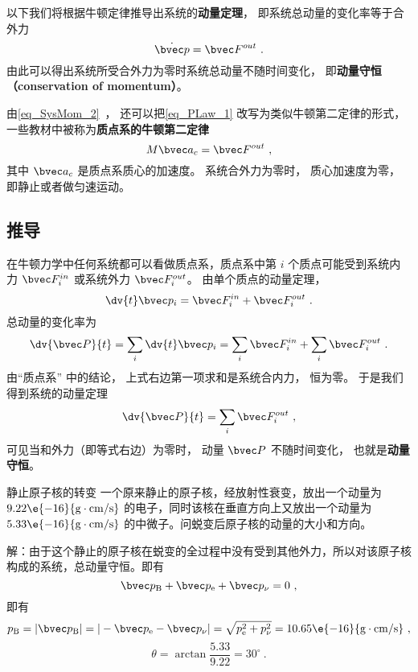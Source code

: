 
以下我们将根据牛顿定律推导出系统的\textbf{动量定理}， 即系统总动量的变化率等于合外力
\begin{equation}\label{eq_PLaw_1}
\dot {\bvec p} = \bvec F^{out}~.
\end{equation}
由此可以得出系统所受合外力为零时系统总动量不随时间变化， 即\textbf{动量守恒（conservation of momentum）}。

由\autoref{eq_SysMom_2}~， 还可以把\autoref{eq_PLaw_1} 改写为类似牛顿第二定律的形式， 一些教材中被称为\textbf{质点系的牛顿第二定律}
\begin{equation}\label{eq_PLaw_2}
M \bvec a_c = \bvec F^{out}~,
\end{equation}
其中 $\bvec a_c$ 是质点系质心的加速度。 系统合外力为零时， 质心加速度为零， 即静止或者做匀速运动。

\subsection{推导}
在牛顿力学中任何系统都可以看做质点系，质点系中第 $i$ 个质点可能受到系统内力 $\bvec F_i^{in}$ 或系统外力 $\bvec F_i^{out}$。 由单个质点的动量定理，
\begin{equation}
\dv{t} \bvec p_i = \bvec F_i^{in} + \bvec F_i^{out}~.
\end{equation}
总动量的变化率为
\begin{equation}
\dv{\bvec P}{t} = \sum_i \dv{t} \bvec p_i  = \sum_i \bvec F_i^{in}  + \sum_i \bvec F_i^{out}~.
\end{equation}
由“质点系” 中的结论， 上式右边第一项求和是系统合内力， 恒为零。 于是我们得到系统的动量定理
\begin{equation}
\dv{\bvec P}{t} = \sum_i \bvec F_i^{out}~,
\end{equation}
可见当和外力（即等式右边）为零时， 动量 $\bvec P$ 不随时间变化， 也就是\textbf{动量守恒}。

\begin{example}{静止原子核的转变}
一个原来静止的原子核，经放射性衰变，放出一个动量为 $9.22\e{-16}{\rm g\cdot cm/s}$ 的电子，同时该核在垂直方向上又放出一个动量为 $5.33\e{-16}{\rm g\cdot cm/s}$ 的中微子。问蜕变后原子核的动量的大小和方向。

解：由于这个静止的原子核在蜕变的全过程中没有受到其他外力，所以对该原子核构成的系统，总动量守恒。即有
\begin{equation}
\bvec p_{\rm B}+\bvec p_{\rm e}+\bvec p_{\rm \nu}=0~,
\end{equation}
即有
\begin{equation}
p_{\rm B}=|\bvec p_{\rm B}|=|-\bvec p_{\rm e}-\bvec p_{\rm \nu}|=\sqrt{p_{\rm e}^{2}+p_{\rm \nu}^{2}}=10.65\e{-16}{\rm g\cdot cm/s}~,
\end{equation}
\begin{equation}
\theta=\arctan\frac{5.33}{9.22}=30^\circ~.
\end{equation}
\end{example}
